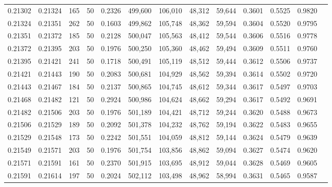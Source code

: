\begin{tabular}{rrrrrrrrrrrrr}
0.21302 & 0.21324 &   165 &  50 &                                     0.2326 & 499,600 & 106,010 &  48,312 &  59,644 & 0.3601 & 0.5525 & 0.9820 \\
0.21324 & 0.21351 &   262 &  50 &                                     0.1603 & 499,862 & 105,748 &  48,362 &  59,594 & 0.3604 & 0.5520 & 0.9795 \\
0.21351 & 0.21372 &   185 &  50 &                                     0.2128 & 500,047 & 105,563 &  48,412 &  59,544 & 0.3606 & 0.5516 & 0.9778 \\
0.21372 & 0.21395 &   203 &  50 &                                     0.1976 & 500,250 & 105,360 &  48,462 &  59,494 & 0.3609 & 0.5511 & 0.9760 \\
0.21395 & 0.21421 &   241 &  50 &                                     0.1718 & 500,491 & 105,119 &  48,512 &  59,444 & 0.3612 & 0.5506 & 0.9737 \\
0.21421 & 0.21443 &   190 &  50 &                                     0.2083 & 500,681 & 104,929 &  48,562 &  59,394 & 0.3614 & 0.5502 & 0.9720 \\
0.21443 & 0.21467 &   184 &  50 &                                     0.2137 & 500,865 & 104,745 &  48,612 &  59,344 & 0.3617 & 0.5497 & 0.9703 \\
0.21468 & 0.21482 &   121 &  50 &                                     0.2924 & 500,986 & 104,624 &  48,662 &  59,294 & 0.3617 & 0.5492 & 0.9691 \\
0.21482 & 0.21506 &   203 &  50 &                                     0.1976 & 501,189 & 104,421 &  48,712 &  59,244 & 0.3620 & 0.5488 & 0.9673 \\
0.21506 & 0.21529 &   189 &  50 &                                     0.2092 & 501,378 & 104,232 &  48,762 &  59,194 & 0.3622 & 0.5483 & 0.9655 \\
0.21529 & 0.21548 &   173 &  50 &                                     0.2242 & 501,551 & 104,059 &  48,812 &  59,144 & 0.3624 & 0.5479 & 0.9639 \\
0.21549 & 0.21571 &   203 &  50 &                                     0.1976 & 501,754 & 103,856 &  48,862 &  59,094 & 0.3627 & 0.5474 & 0.9620 \\
0.21571 & 0.21591 &   161 &  50 &                                     0.2370 & 501,915 & 103,695 &  48,912 &  59,044 & 0.3628 & 0.5469 & 0.9605 \\
0.21591 & 0.21614 &   197 &  50 &                                     0.2024 & 502,112 & 103,498 &  48,962 &  58,994 & 0.3631 & 0.5465 & 0.9587 \\

\end{tabular}
